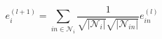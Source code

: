 

\begin{equation}\label{eq:csgcn_is_gc_layer_item}
    e_{i}^{(l+1)}=\sum_{in\in \mathcal{N}_{i}}\frac{1}{\sqrt{|\mathcal{N}_{i}|} \sqrt{|\mathcal{N}_{in}|}}e_{in}^{(l)}
\end{equation}

